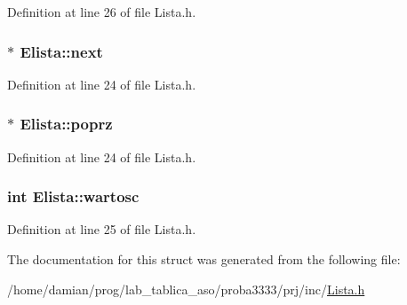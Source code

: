 Definition at line 26 of file Lista.\-h.

\hypertarget{struct_elista_a2821644b4d0ca73d75a895cf326664da}{
\subsubsection[{next}]{$\ast$ Elista\-::next}}\label{struct_elista_a2821644b4d0ca73d75a895cf326664da}


Definition at line 24 of file Lista.\-h.

\hypertarget{struct_elista_aa4bfee465e1ea4484c9aeddc2437e532}{
\subsubsection[{poprz}]{ $\ast$ Elista\-::poprz}}\label{struct_elista_aa4bfee465e1ea4484c9aeddc2437e532}


Definition at line 24 of file Lista.\-h.

\hypertarget{struct_elista_a8de211523404f6484098bc85dd1ce52b}{
\subsubsection[{wartosc}]{\setlength{\rightskip}{0pt plus 5cm}int Elista\-::wartosc}}\label{struct_elista_a8de211523404f6484098bc85dd1ce52b}


Definition at line 25 of file Lista.\-h.



The documentation for this struct was generated from the following file\-:\begin{DoxyCompactItemize}
\item 
/home/damian/prog/lab\-\_\-tablica\-\_\-aso/proba3333/prj/inc/\hyperlink{_lista_8h}{Lista.\-h}\end{DoxyCompactItemize}
